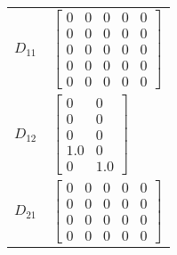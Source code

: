 \begin{tabular}{cl}
 $D_{11}$ & $\left[\begin{matrix}0 & 0 & 0 & 0 & 0\\0 & 0 & 0 & 0 & 0\\0 & 0 & 0 & 0 & 0\\0 & 0 & 0 & 0 & 0\\0 & 0 & 0 & 0 & 0\end{matrix}\right]$                                                                         \\
 $D_{12}$ & $\left[\begin{matrix}0 & 0\\0 & 0\\0 & 0\\1.0 & 0\\0 & 1.0\end{matrix}\right]$                                                                                                                                 \\
 $D_{21}$ & $\left[\begin{matrix}0 & 0 & 0 & 0 & 0\\0 & 0 & 0 & 0 & 0\\0 & 0 & 0 & 0 & 0\\0 & 0 & 0 & 0 & 0\end{matrix}\right]$                                                                                            \\
\hline
\end{tabular}